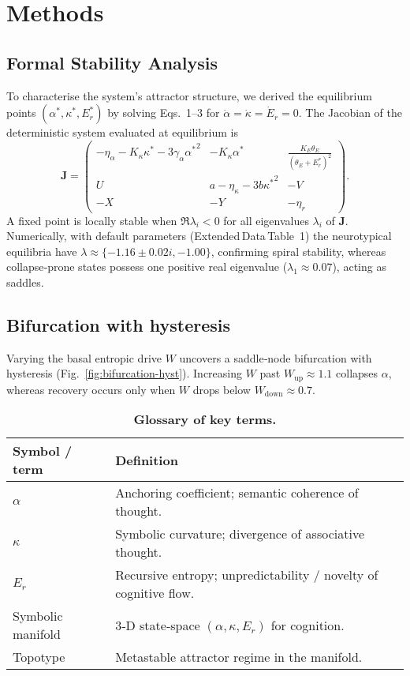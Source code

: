 \section*{Methods}


\subsection*{Formal Stability Analysis}
To characterise the system's attractor structure, we derived the equilibrium points $(\alpha^{\ast},\kappa^{\ast},E_r^{\ast})$ by solving Eqs.~1–3 for $\dot{\alpha}=\dot{\kappa}=\dot{E}_r=0$.
The Jacobian of the deterministic system evaluated at equilibrium is
\[
\mathbf{J}=
\begin{pmatrix}
-\eta_{\alpha}-K_{\kappa}\kappa^{\ast}-3\gamma_{\alpha}{\alpha^{\ast}}^{2} &
-K_{\kappa}\alpha^{\ast} &
\displaystyle\frac{K_E\theta_E}{(\theta_E+E_r^{\ast})^{2}}
\\
U &
a-\eta_{\kappa}-3b{\kappa^{\ast}}^{2} &
-V
\\
-X &
-Y &
-\eta_{r}
\end{pmatrix}.
\]
A fixed point is locally stable when $\Re\lambda_i<0$ for all eigenvalues $\lambda_i$ of $\mathbf{J}$.
Numerically, with default parameters (Extended Data Table 1) the neurotypical equilibria have $\lambda\approx\{-1.16\pm0.02i,-1.00\}$, confirming spiral stability, whereas collapse‑prone states possess one positive real eigenvalue ($\lambda_{1}\approx0.07$), acting as saddles.

\subsection*{Bifurcation with hysteresis}
Varying the basal entropic drive $W$ uncovers a saddle‑node bifurcation with hysteresis (Fig.~\ref{fig:bifurcation-hyst}). Increasing $W$ past $W_{\mathrm{up}}\approx1.1$ collapses $\alpha$, whereas recovery occurs only when $W$ drops below $W_{\mathrm{down}}\approx0.7$.

\begin{table}[t]
\caption{\textbf{Glossary of key terms.}}
\label{tab:glossary}
\renewcommand{\arraystretch}{1.15}
\begin{tabular}{p{3cm}p{12cm}}
\textbf{Symbol / term} & \textbf{Definition} \\ \hline
$\alpha$ & Anchoring coefficient; semantic coherence of thought. \\
$\kappa$ & Symbolic curvature; divergence of associative thought. \\
$E_r$ & Recursive entropy; unpredictability / novelty of cognitive flow. \\
Symbolic manifold & 3‑D state‑space $(\alpha,\kappa,E_r)$ for cognition. \\
Topotype & Metastable attractor regime in the manifold. \\ \hline
\end{tabular}
\end{table}
